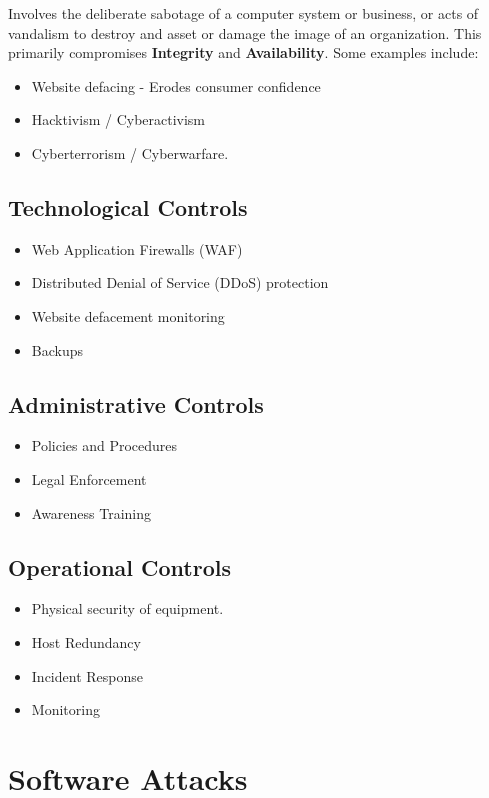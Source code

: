 \documentclass[12pt letter]{report}
\begin{document}
Involves the deliberate sabotage of a computer system or business, or
acts of vandalism to destroy and asset or damage the image of an
organization. This primarily compromises \textbf{Integrity} and
\textbf{Availability}. Some examples include:

\begin{itemize}
  \item Website defacing - Erodes consumer confidence
  \item Hacktivism / Cyberactivism
  \item Cyberterrorism / Cyberwarfare.
\end{itemize}

\subsection{Technological Controls}

\begin{itemize}
  \item Web Application Firewalls (WAF)
  \item Distributed Denial of Service (DDoS) protection
  \item Website defacement monitoring
  \item Backups
\end{itemize}

\subsection{Administrative Controls}
\begin{itemize}
  \item Policies and Procedures
  \item Legal Enforcement
  \item Awareness Training
\end{itemize}

\subsection{Operational Controls}
\begin{itemize}
  \item Physical security of equipment.
  \item Host Redundancy
  \item Incident Response
  \item Monitoring
\end{itemize}

\section{Software Attacks}
\end{document}
